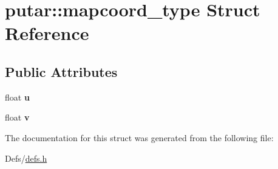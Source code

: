 \hypertarget{structputar_1_1mapcoord__type}{}\section{putar\+:\+:mapcoord\+\_\+type Struct Reference}
\label{structputar_1_1mapcoord__type}
\subsection*{Public Attributes}
\begin{DoxyCompactItemize}
\item 
float {\bfseries u}\hypertarget{structputar_1_1mapcoord__type_a111e5f1af14a13716b124b5adfee16a5}{}\label{structputar_1_1mapcoord__type_a111e5f1af14a13716b124b5adfee16a5}

\item 
float {\bfseries v}\hypertarget{structputar_1_1mapcoord__type_a0625dcacb5b03d2eaf9c31bc454bfbf0}{}\label{structputar_1_1mapcoord__type_a0625dcacb5b03d2eaf9c31bc454bfbf0}

\end{DoxyCompactItemize}


The documentation for this struct was generated from the following file\+:\begin{DoxyCompactItemize}
\item 
Defs/\hyperlink{defs_8h}{defs.\+h}\end{DoxyCompactItemize}
